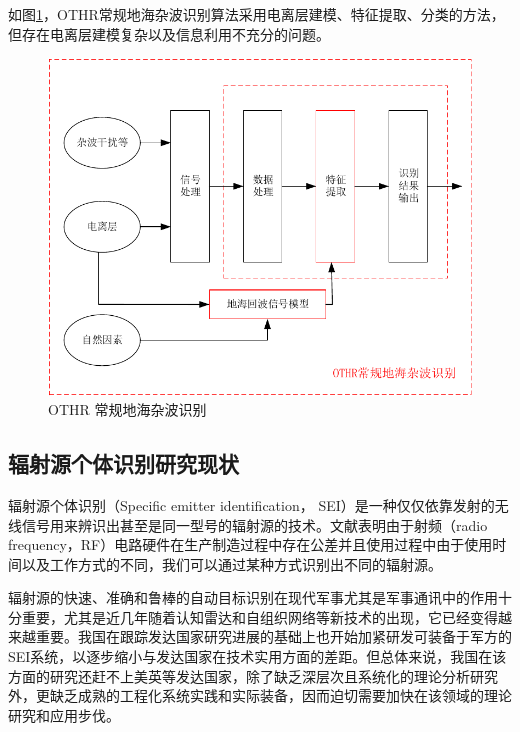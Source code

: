 如图\ref{fig:othr_tradition}，OTHR常规地海杂波识别算法采用电离层建模、特征提取、分类的方法，但存在电离层建模复杂以及信息利用不充分的问题。
\begin{figure}[htb]
	\centering
	\includegraphics[width=\textwidth]{figures/introduction/othr_tradition}
	\caption{OTHR 常规地海杂波识别}
	\label{fig:othr_tradition}
\end{figure}



\subsection{辐射源个体识别研究现状}
辐射源个体识别（Specific emitter identification， SEI）是一种仅仅依靠发射的无线信号用来辨识出甚至是同一型号的辐射源的技术\cite{Talbot2003Specific}。文献\cite{danev2012physical}表明由于射频（radio frequency，RF）电路硬件在生产制造过程中存在公差并且使用过程中由于使用时间以及工作方式的不同，我们可以通过某种方式识别出不同的辐射源。

辐射源的快速、准确和鲁棒的自动目标识别在现代军事尤其是军事通讯中的作用十分重要\cite{wiley2006elint}，尤其是近几年随着认知雷达\cite{kim2008specific}和自组织网络\cite{zhang2013self}等新技术的出现，它已经变得越来越重要。我国在跟踪发达国家研究进展的基础上也开始加紧研发可装备于军方的SEI系统，以逐步缩小与发达国家在技术实用方面的差距。但总体来说，我国在该方面的研究还赶不上美英等发达国家，除了缺乏深层次且系统化的理论分析研究外，更缺乏成熟的工程化系统实践和实际装备，因而迫切需要加快在该领域的理论研究和应用步伐。

